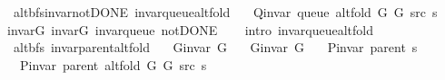 \begin{isabellebody}
\endisatagproof
{\isafoldproof}%
%
\isadelimproof
\isanewline
%
\endisadelimproof
\isanewline
{}\isamarkupfalse%
\ {\isacharparenleft}{\kern0pt}\ alt{\isacharunderscore}{\kern0pt}bfs{\isacharunderscore}{\kern0pt}invar{\isacharunderscore}{\kern0pt}not{\isacharunderscore}{\kern0pt}DONE{\isacharparenright}{\kern0pt}\ invar{\isacharunderscore}{\kern0pt}queue{\isacharunderscore}{\kern0pt}alt{\isacharunderscore}{\kern0pt}fold{\isacharcolon}{\kern0pt}\isanewline
\ \ \ {\isachardoublequoteopen}Q{\isacharunderscore}{\kern0pt}invar\ {\isacharparenleft}{\kern0pt}queue\ {\isacharparenleft}{\kern0pt}alt{\isacharunderscore}{\kern0pt}fold\ G{}\ G{}\ src\ s{\isacharparenright}{\kern0pt}{\isacharparenright}{\kern0pt}{\isachardoublequoteclose}\isanewline
%
\isadelimproof
\ \ %
\endisadelimproof
%
\isatagproof
{}\isamarkupfalse%
\ invar{\isacharunderscore}{\kern0pt}G{}\ invar{\isacharunderscore}{\kern0pt}G{}\ invar{\isacharunderscore}{\kern0pt}queue\ not{\isacharunderscore}{\kern0pt}DONE\isanewline
\ \ \isamarkupfalse%
\ {\isacharparenleft}{\kern0pt}intro\ invar{\isacharunderscore}{\kern0pt}queue{\isacharunderscore}{\kern0pt}alt{\isacharunderscore}{\kern0pt}fold{\isacharparenright}{\kern0pt}%
\endisatagproof
{\isafoldproof}%
%
\isadelimproof
\isanewline
%
\endisadelimproof
%
\isadeliminvisible
\isanewline
%
\endisadeliminvisible
%
\isataginvisible
{}\isamarkupfalse%
\ {\isacharparenleft}{\kern0pt}\ alt{\isacharunderscore}{\kern0pt}bfs{\isacharparenright}{\kern0pt}\ invar{\isacharunderscore}{\kern0pt}parent{\isacharunderscore}{\kern0pt}alt{\isacharunderscore}{\kern0pt}fold{\isacharcolon}{\kern0pt}\isanewline
\ \ \ {\isachardoublequoteopen}G{\isachardot}{\kern0pt}invar\ G{}{\isachardoublequoteclose}\isanewline
\ \ \ {\isachardoublequoteopen}G{\isachardot}{\kern0pt}invar\ G{}{\isachardoublequoteclose}\isanewline
\ \ \ {\isachardoublequoteopen}P{\isacharunderscore}{\kern0pt}invar\ {\isacharparenleft}{\kern0pt}parent\ s{\isacharparenright}{\kern0pt}{\isachardoublequoteclose}\isanewline
\ \ \ {\isachardoublequoteopen}P{\isacharunderscore}{\kern0pt}invar\ {\isacharparenleft}{\kern0pt}parent\ {\isacharparenleft}{\kern0pt}alt{\isacharunderscore}{\kern0pt}fold\ G{}\ G{}\ src\ s{\isacharparenright}{\kern0pt}{\isacharparenright}{\kern0pt}{\isachardoublequoteclose}%
\endisataginvisible
{\isafoldinvisible}%

\end{isabellebody}
